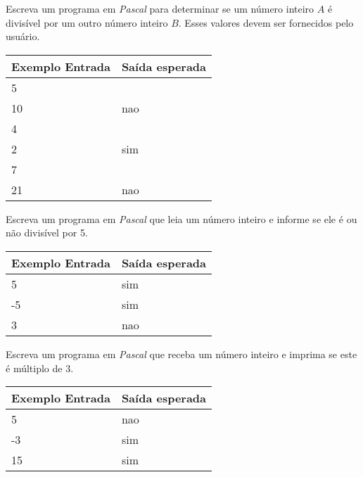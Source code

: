\item Escreva um programa em \emph{Pascal} para determinar se um número 
inteiro $A$ é divisível por um outro número inteiro $B$. Esses valores 
devem ser fornecidos pelo usuário.

\begin{center}
\begin{tabular}{|l|l|} \hline
Exemplo Entrada & Saída esperada \\ \hline
5                &                \\
10               & nao               \\ \hline
4                &                \\ 
2                & sim               \\ \hline
7                &                \\ 
21               & nao              \\ \hline
\end{tabular}
\end{center}

\item Escreva um programa em \emph{Pascal} que leia um número inteiro e 
informe se ele é ou não divisível por 5.

\begin{center}
\begin{tabular}{|l|l|} \hline
Exemplo Entrada & Saída esperada \\ \hline
5                & sim               \\ \hline
-5                & sim               \\ \hline
3                &  nao              \\ \hline
\end{tabular}
\end{center}

\item Escreva um programa em \emph{Pascal} que receba um número inteiro e 
imprima se este é múltiplo de 3.

\begin{center}
\begin{tabular}{|l|l|} \hline
Exemplo Entrada & Saída esperada \\ \hline
5                & nao               \\ \hline
-3                & sim               \\ \hline
15                & sim               \\ \hline
\end{tabular}
\end{center}

